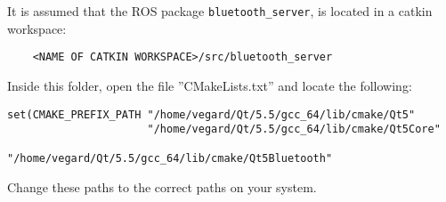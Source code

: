 It is assumed that the \ac{ROS} package \texttt{bluetooth\_server}, is located in a catkin workspace:
\begin{verbatim}
	<NAME OF CATKIN WORKSPACE>/src/bluetooth_server
\end{verbatim}

Inside this folder, open the file ''CMakeLists.txt'' and locate the following:

\begin{verbatim}
set(CMAKE_PREFIX_PATH "/home/vegard/Qt/5.5/gcc_64/lib/cmake/Qt5"
					  "/home/vegard/Qt/5.5/gcc_64/lib/cmake/Qt5Core"
					  "/home/vegard/Qt/5.5/gcc_64/lib/cmake/Qt5Bluetooth"
\end{verbatim}

Change these paths to the correct paths on your system.



